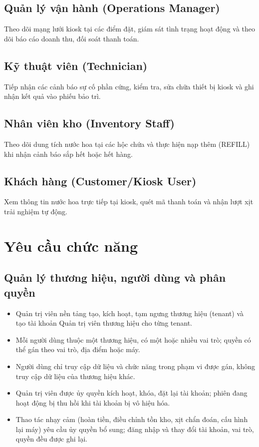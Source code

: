 {\subsection{Quản lý vận hành (Operations Manager)}
Theo dõi mạng lưới kiosk tại các điểm đặt, giám sát tình trạng hoạt động và theo dõi báo cáo doanh thu, đối soát thanh toán.

\subsection{Kỹ thuật viên (Technician)}
Tiếp nhận các cảnh báo sự cố phần cứng, kiểm tra, sửa chữa thiết bị kiosk và ghi nhận kết quả vào phiếu bảo trì.

\subsection{Nhân viên kho (Inventory Staff)}
Theo dõi dung tích nước hoa tại các hộc chứa và thực hiện nạp thêm (REFILL) khi nhận cảnh báo sắp hết hoặc hết hàng.

\subsection{Khách hàng (Customer/Kiosk User)}
Xem thông tin nước hoa trực tiếp tại kiosk, quét mã thanh toán và nhận lượt xịt trải nghiệm tự động.

}
\section{Yêu cầu chức năng}

\subsection{Quản lý thương hiệu, người dùng và phân quyền}
\begin{itemize}
  \item Quản trị viên nền tảng tạo, kích hoạt, tạm ngưng thương hiệu (tenant) và tạo tài khoản Quản trị viên thương hiệu cho từng tenant.
  \item Mỗi người dùng thuộc một thương hiệu, có một hoặc nhiều vai trò; quyền có thể gán theo vai trò, địa điểm hoặc máy.
  \item Người dùng chỉ truy cập dữ liệu và chức năng trong phạm vi được gán, không truy cập dữ liệu của thương hiệu khác.
  \item Quản trị viên được ủy quyền kích hoạt, khóa, đặt lại tài khoản; phiên đang hoạt động bị thu hồi khi tài khoản bị vô hiệu hóa.
  \item Thao tác nhạy cảm (hoàn tiền, điều chỉnh tồn kho, xịt chẩn đoán, cấu hình lại máy) yêu cầu ủy quyền bổ sung; đăng nhập và thay đổi tài khoản, vai trò, quyền đều được ghi lại.
\end{itemize}

